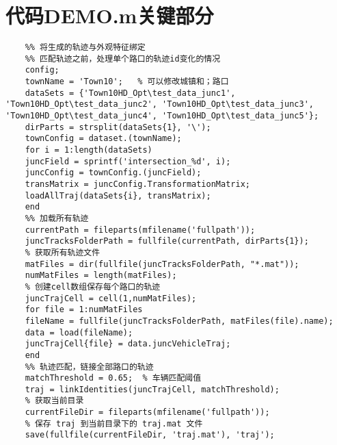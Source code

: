 \section{代码DEMO.m关键部分}


\begin{lstlisting}
	%% 将生成的轨迹与外观特征绑定
	%% 匹配轨迹之前，处理单个路口的轨迹id变化的情况
	config;
	townName = 'Town10';   % 可以修改城镇和；路口
	dataSets = {'Town10HD_Opt\test_data_junc1', 'Town10HD_Opt\test_data_junc2', 'Town10HD_Opt\test_data_junc3', 'Town10HD_Opt\test_data_junc4', 'Town10HD_Opt\test_data_junc5'};
	dirParts = strsplit(dataSets{1}, '\');
	townConfig = dataset.(townName);
	for i = 1:length(dataSets)
	juncField = sprintf('intersection_%d', i);
	juncConfig = townConfig.(juncField);
	transMatrix = juncConfig.TransformationMatrix;
	loadAllTraj(dataSets{i}, transMatrix);
	end
	%% 加载所有轨迹
	currentPath = fileparts(mfilename('fullpath'));
	juncTracksFolderPath = fullfile(currentPath, dirParts{1});
	% 获取所有轨迹文件
	matFiles = dir(fullfile(juncTracksFolderPath, "*.mat"));
	numMatFiles = length(matFiles);
	% 创建cell数组保存每个路口的轨迹
	juncTrajCell = cell(1,numMatFiles);
	for file = 1:numMatFiles
	fileName = fullfile(juncTracksFolderPath, matFiles(file).name);
	data = load(fileName);
	juncTrajCell{file} = data.juncVehicleTraj;
	end
	%% 轨迹匹配，链接全部路口的轨迹
	matchThreshold = 0.65;  % 车辆匹配阈值
	traj = linkIdentities(juncTrajCell, matchThreshold);
	% 获取当前目录
	currentFileDir = fileparts(mfilename('fullpath')); 
	% 保存 traj 到当前目录下的 traj.mat 文件
	save(fullfile(currentFileDir, 'traj.mat'), 'traj');
\end{lstlisting}


